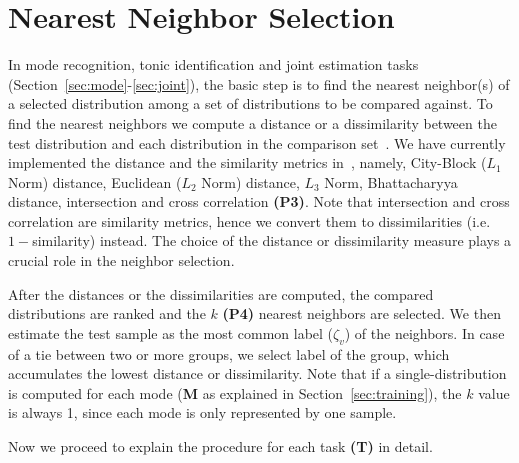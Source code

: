 \documentclass{sig-alternate}
\begin{document}
\section{Nearest Neighbor Selection}\label{sec:distance}
In mode recognition, tonic identification and joint estimation tasks (Section~\ref{sec:mode}-\ref{sec:joint}), the basic step is to find the nearest neighbor(s) of a selected distribution among a set of distributions to be compared against. To find the nearest neighbors we compute a distance or a dissimilarity between the test distribution and each distribution in the comparison set~\cite{distance}. We have currently implemented the distance and the similarity metrics in~\cite{bozkurt_makam, chordia}, namely, City-Block ($L_1$ Norm) distance, Euclidean ($L_2$ Norm) distance, $L_3$ Norm, Bhattacharyya distance, intersection and cross correlation {\bf (P3)}. Note that intersection and cross correlation are similarity metrics, hence we convert them to dissimilarities (i.e. $1 - $similarity) instead. The choice of the distance or dissimilarity measure plays a crucial role in the neighbor selection.

After the distances or the dissimilarities are computed, the compared distributions are ranked and the $k$ {\bf (P4)} nearest neighbors are selected. We then estimate the test sample as the most common label ($\zeta_v$) of the neighbors. In case of a tie between two or more groups, we select label of the group, which accumulates the lowest distance or dissimilarity. Note that if a single-distribution is computed for each mode ({\bf M} as explained in Section~\ref{sec:training}), the $k$ value is always 1, since each mode is only represented by one sample.

Now we proceed to explain the procedure for each task {\bf(T)} in detail.
\end{document}
